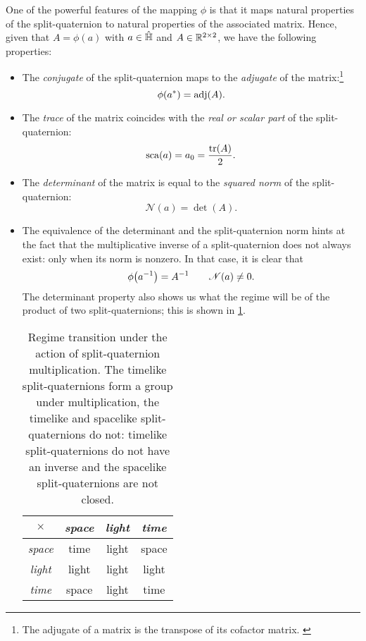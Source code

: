 One of the powerful features of the mapping $\phi$ is that it maps natural properties of the split-quaternion to natural properties of the associated matrix. Hence, given that $A = \phi(a)$ with $a \in \hat{\mathbb{H}}$ and $A \in \mathbb{R}^{2\times2}$, we have the following properties: 
\begin{itemize}
    \item The \emph{conjugate} of the split-quaternion maps to the \emph{adjugate} of the matrix:\footnote
        {The adjugate of a matrix is the transpose of its cofactor matrix. \cite{Verhaegen2007}}
        $$ \phi(a^*) = \operatorname{adj}(A). $$
    \item The \emph{trace} of the matrix coincides with the \emph{real or scalar part} of the split-quaternion:
        $$ \scapart{a} = a_0 = \frac{\trace(A)}{2}. $$
    \item The \emph{determinant} of the matrix is equal to the \emph{squared norm} of the split-quaternion:
        $$ \mathscr{N}(a) = \det(A). $$
    \item The equivalence of the determinant and the split-quaternion norm hints at the fact that the multiplicative inverse of a split-quaternion does not always exist: only when its norm is nonzero. In that case, it is clear that
        $$ \phi\qty(a^{-1}) = A^{-1} \qquad \mathscr{N}(a) \neq 0. $$
    The determinant property also shows us what the regime will be of the product of two split-quaternions; this is shown in \cref{tab:multiplication_class}.
        \begin{table}[h!]
        \centering
        \caption{Regime transition under the action of split-quaternion multiplication. The timelike split-quaternions form a group under multiplication, the timelike and spacelike split-quaternions do not: timelike split-quaternions do not have an inverse and the spacelike split-quaternions are not closed.}
        \label{tab:multiplication_class}
        \begin{tabular}{c|ccc}
            \toprule
            $\times$ & \emph{space} & \emph{light} & \emph{time} \\[1mm]
            \hline
            \emph{space} & time  & light & space \\
            \emph{light} & light & light & light \\
            \emph{time} &  space & light & time \\
            \bottomrule
        \end{tabular}
        \end{table}

\end{itemize}
